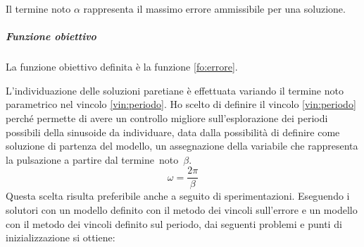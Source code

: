 \documentclass[a4paper,12pt]{report}
\begin{document}
Il termine noto $ \alpha $ rappresenta il massimo errore ammissibile per una soluzione.

\subparagraph{Funzione obiettivo}
La funzione obiettivo definita è la funzione \eqref{fo:errore}.

L'individuazione delle soluzioni paretiane è effettuata variando il termine noto parametrico nel vincolo \eqref{vin:periodo}.
Ho scelto di definire il vincolo \eqref{vin:periodo} perché permette di avere un controllo migliore sull'esplorazione dei periodi possibili della sinusoide da individuare, data dalla possibilità di definire come soluzione di partenza del modello, un assegnazione della variabile che rappresenta la pulsazione a partire dal termine~noto~$\beta $.
\begin{equation}
  \omega = \frac{2\pi}{\beta}
\end{equation}
Questa scelta risulta preferibile anche a seguito di sperimentazioni. Eseguendo i solutori con un modello definito con il metodo dei vincoli sull'errore e un modello con il metodo dei vincoli definito sul periodo, dai seguenti problemi e punti di inizializzazione si ottiene:
\end{document}
